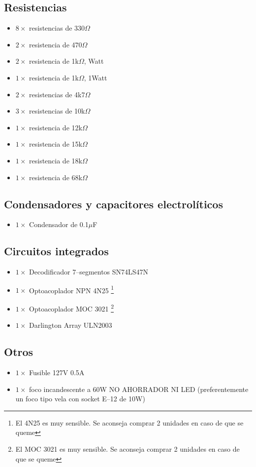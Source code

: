 \documentclass[letterpaper,10.5pt]{article}
\begin{document}
\subsection{Resistencias}
\begin{itemize}[nosep]
	\item $8\times$ resistencias de 330$\Omega$
	\item $2\times$ resistencia  de 470$\Omega$
	\item $2\times$ resistencia  de  1k$\Omega$, Watt
	\item $1\times$ resistencia  de  1k$\Omega$, 1Watt
	\item $2\times$ resistencias de 4k7$\Omega$
	\item $3\times$ resistencias de 10k$\Omega$
	\item $1\times$ resistencia  de 12k$\Omega$
	\item $1\times$ resistencia  de 15k$\Omega$
	\item $1\times$ resistencia  de 18k$\Omega$
	\item $1\times$ resistencia  de 68k$\Omega$
\end{itemize}

\subsection{Condensadores y capacitores electrolíticos}
\begin{itemize}[nosep]
	\item $1\times$ Condensador de 0.1$\mu$F
\end{itemize}

\subsection{Circuitos integrados}
\begin{itemize}[nosep]
	\item $1\times$ Decodificador 7–segmentos SN74LS47N
	\item $1\times$ Optoacoplador NPN 4N25
	\footnote{El 4N25 es muy sensible. Se aconseja comprar 2 unidades en caso de que se queme} %
	\item $1\times$ Optoacoplador MOC 3021
	\footnote{El MOC 3021 es muy sensible. Se aconseja comprar 2 unidades en caso de que se queme} %
	\item $1\times$ Darlington Array ULN2003
\end{itemize}

\subsection{Otros}
\begin{itemize}[nosep]
	\item $1\times$ Fusible 127V 0.5A
	\item $1\times$ foco incandescente a 60W NO AHORRADOR NI LED
	(preferentemente un foco tipo vela con socket E--12 de 10W)
\end{itemize}
\end{document}

